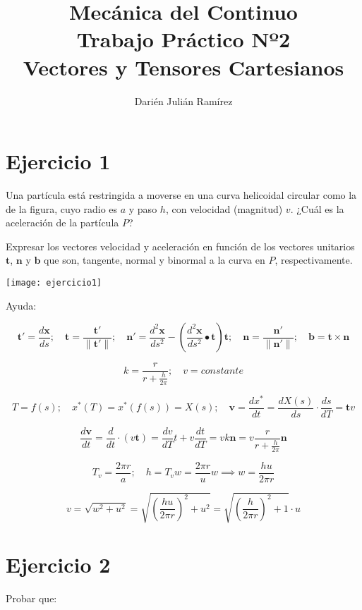 \documentclass[a4paper,12pt,twoside,final,spanish]{article}
\title{\Huge Mecánica del Continuo\\
Trabajo Práctico Nº2\\
Vectores y Tensores Cartesianos}
\author{Darién Julián Ramírez}
\date{\vspace{-5ex}}
\begin{document}
\maketitle %

\section*{Ejercicio 1}

Una partícula está restringida a moverse en una curva helicoidal circular como la de la figura, cuyo radio es $a$ y paso $h$, con velocidad (magnitud) $v$. ¿Cuál es la aceleración de la  partícula  $P$?

Expresar los vectores velocidad y aceleración en función de los vectores unitarios $\mathbf{t}$, $\mathbf{n}$ y $\mathbf{b}$ que son, tangente, normal y binormal a la curva en $P$, respectivamente.

\begin{center}
\texttt{[image: ejercicio1]}
\end{center}

Ayuda:

\[
\mathbf{t}'=\frac{d\mathbf{x}}{ds}; \quad 
\mathbf{t}=\frac{\mathbf{t}'}{\|\mathbf{t}'\|}; \quad
\mathbf{n}'=\frac{d^2\mathbf{x}}{ds^2}-\left(\frac{d^2\mathbf{x}}{ds^2}\bullet\mathbf{t}\right)\mathbf{t}; \quad
\mathbf{n}=\frac{\mathbf{n}'}{\|\mathbf{n}'\|}; \quad
\mathbf{b}=\mathbf{t}\times\mathbf{n}
\]

\dotfill

\[
k=\frac{r}{r+\frac{h}{2\pi}};\quad v=constante
\]

\[
T=f(s);\quad x^*(T)=x^*(f(s))=X(s);\quad \mathbf{v}=\frac{dx^*}{dt}=\frac{dX(s)}{ds}\cdot\frac{ds}{dT}=\mathbf{t}v
\]

\[
\frac{d\mathbf{v}}{dt}=\frac{d}{dt}\cdot(v\mathbf{t})=\frac{dv}{dT}t+v\frac{dt}{dT}=vk\mathbf{n}=v\frac{r}{r+\frac{h}{2\pi}}\mathbf{n}
\]

\[
T_{v}=\frac{2\pi r}{a};\quad h=T_{v}w=\frac{2\pi r}{u}w\implies w=\frac{hu}{2\pi r}
\]

\[
v=\sqrt{w^2+u^2}=\sqrt{\left(\frac{hu}{2\pi r}\right)^{2}+u^2}=\sqrt{\left(\frac{h}{2\pi r}\right)^{2}+1}\cdot u
\]

\section*{Ejercicio 2}

Probar que:
\end{document}
